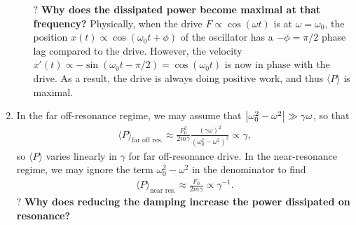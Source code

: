 \documentclass{article}
\theoremstyle{definition}
\newcommand{\f}[2]{\frac{#1}{#2}}
\begin{document}
\begin{enumerate}[label= \alph*)]
\begin{enumerate}[label=\roman*)]
	
	
	
	$\boxed{\textbf{?}}$ \textbf{Why does the dissipated power become maximal at that frequency? } Physically, when the drive $F \propto \cos (\omega t)$ is at $\omega = \omega_0$, the position $x(t) \propto \cos(\omega_0 t + \phi)$ of the oscillator has a $-\phi =\pi/2$ phase lag compared to the drive. However, the velocity $x'(t) \propto -\sin(\omega_0 t -\pi/2) = \cos(\omega_0 t)$ is now in phase with the drive. As a result, the drive is always doing positive work, and thus $\langle P \rangle$ is maximal.  
	
	
	\end{enumerate}
	
	\item In the far off-resonance regime, we may assume that $\abs{\omega_0^2 - \omega^2}\gg \gamma \omega$, so that 
	\begin{align*}
	\langle P \rangle_\text{far off res.}  \approx   \f{F_0^2}{2m\gamma} \f{(\gamma \omega)^2}{(\omega_0^2 - \omega^2)^2} \propto \gamma,
	\end{align*}
	so $\langle P \rangle$ varies linearly in $\gamma$ for far off-resonance drive. In the near-resonance regime, we may ignore the term $\omega_0^2 - \omega^2$ in the denominator to find 
	\begin{align*}
	\langle P \rangle_\text{near res.} \approx \f{F_0}{2m\gamma} \propto \gamma^{-1}.
	\end{align*}
	$\boxed{\textbf{?}}$ \textbf{Why does reducing the damping increase the power dissipated on resonance?} 
	
	
	

\end{enumerate}
\end{document}
